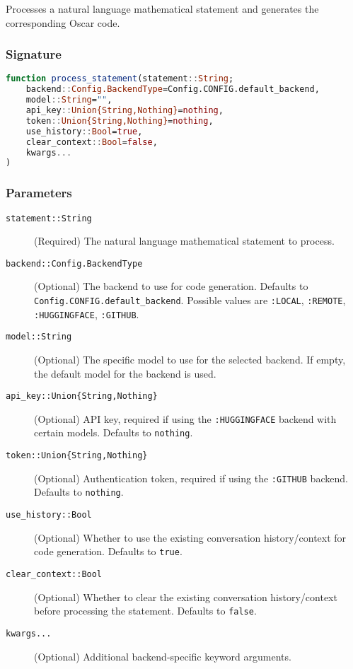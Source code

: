 \documentclass[11pt,a4paper]{article}
\newcommand{\code}[1]{\texttt{#1}}
\providecommand{\code}[1]{\texttt{\color{blue!70!black}#1}}
\begin{document}
Processes a natural language mathematical statement and generates the corresponding Oscar code.

\subsubsection*{Signature}
\begin{lstlisting}[language=Julia]
function process_statement(statement::String; 
    backend::Config.BackendType=Config.CONFIG.default_backend,
    model::String="",
    api_key::Union{String,Nothing}=nothing,
    token::Union{String,Nothing}=nothing,
    use_history::Bool=true,
    clear_context::Bool=false,
    kwargs...
)
\end{lstlisting}

\subsubsection*{Parameters}
\begin{description}
    \item[\code{statement::String}] (Required) The natural language mathematical statement to process.
    \item[\code{backend::Config.BackendType}] (Optional) The backend to use for code generation. Defaults to \code{Config.CONFIG.default\_backend}. Possible values are \code{:LOCAL}, \code{:REMOTE}, \code{:HUGGINGFACE}, \code{:GITHUB}.
    \item[\code{model::String}] (Optional) The specific model to use for the selected backend. If empty, the default model for the backend is used.
    \item[\code{api\_key::Union\{String,Nothing\}}] (Optional) API key, required if using the \code{:HUGGINGFACE} backend with certain models. Defaults to \code{nothing}.
    \item[\code{token::Union\{String,Nothing\}}] (Optional) Authentication token, required if using the \code{:GITHUB} backend. Defaults to \code{nothing}.
    \item[\code{use\_history::Bool}] (Optional) Whether to use the existing conversation history/context for code generation. Defaults to \code{true}.
    \item[\code{clear\_context::Bool}] (Optional) Whether to clear the existing conversation history/context before processing the statement. Defaults to \code{false}.
    \item[\code{kwargs...}] (Optional) Additional backend-specific keyword arguments.
\end{description}
\end{document}

